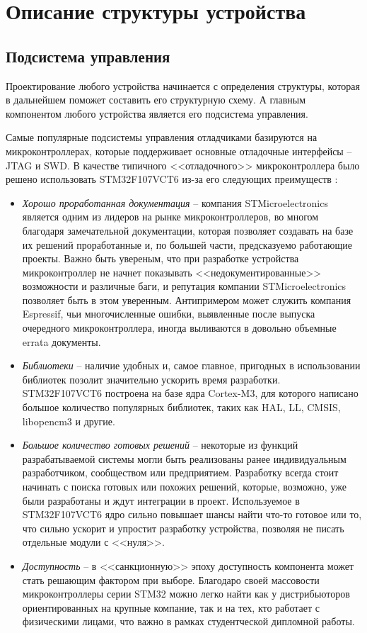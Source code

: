
\chapter{Описание структуры устройства}
\section{Подсистема управления}
\hspace{1cm} 

Проектирование любого устройства начинается с определения структуры, которая в дальнейшем
поможет составить его структурную схему. А главным компонентом любого устройства является
его подсистема управления.

Самые популярные подсистемы управления отладчиками базируются на микроконтроллерах,
которые поддерживает основные отладочные интерфейсы -- JTAG и SWD.
В качестве типичного <<отладочного>> микроконтроллера было решено использовать
STM32F107VCT6 из-за его следующих преимуществ \cite{STM32:datasheet}:

\begin{itemize}
    \item \textit{Хорошо проработанная документация} -- компания
     STMicroelectronics является одним из лидеров на рынке микроконтроллеров, во многом благодаря
     замечательной документации, которая позволяет создавать на базе их решений проработанные
     и, по большей части, предсказуемо работающие проекты. Важно быть увереным, что при разработке
     устройства микроконтроллер не начнет показывать <<недокументированные>> возможности и
     различные баги, и репутация компании STMicroelectronics позволяет быть в этом
     уверенным. Антипримером может служить компания Espressif, чьи многочисленные ошибки,
     выявленные после выпуска очередного микроконтроллера, иногда выливаются в довольно
     объемные errata документы.
    \item \textit{Библиотеки} -- наличие удобных и, самое главное, пригодных в использовании 
     библиотек позолит значительно ускорить время разработки. STM32F107VCT6 построена на базе
     ядра Cortex-M3, для которого написано большое количество популярных библиотек, таких
     как HAL, LL, CMSIS, libopencm3 и другие.
    \item \textit{Большое количество готовых решений} -- некоторые из функций разрабатываемой
     системы могли быть реализованы ранее индивидуальным разработчиком, 
     сообществом или предприятием. Разработку всегда стоит начинать с поиска готовых или похожих 
     решений, которые, возможно, уже были разработаны и ждут интеграции в проект. Используемое
     в STM32F107VCT6 ядро сильно повышает шансы найти что-то готовое или то, что сильно 
     ускорит и упростит разработку устройства, позволяя не писать отдельные модули с <<нуля>>.
     \cite{Lakamera:embed}
    \item \textit{Доступность} -- в <<санкционную>> эпоху доступность компонента может стать 
     решающим фактором при выборе. Благодаро своей массовости микроконтроллеры серии STM32 
     можно легко найти как у дистрибьюторов ориентированных на крупные компание, так и на тех,
     кто работает с физическими лицами, что важно в рамках студентческой дипломной работы.
\end{itemize}

